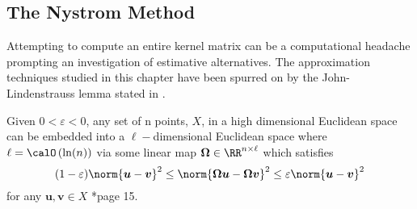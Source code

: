 \subsection{The Nystrom Method}\label{Section2.1}

Attempting to compute an entire kernel matrix can be a computational headache prompting an investigation of estimative alternatives. The approximation techniques studied in this chapter have been spurred on by the John-Lindenstrauss lemma stated in .

\begin{lem} \label{lem: John-Lindenstrauss}
    Given $0 < \varepsilon < 0$, any set of n points, $X$, in a high dimensional Euclidean space can be embedded into a $\ell-$dimensional Euclidean space where $\ell = \calO \left( \ln (n) \right)$ via some linear map $\bm{\Omega} \in \RR^{n \times \ell}$ which satisfies
    \[
        (1 - \varepsilon) \norm{\bm{u} - \bm{v}}^2 \leq \norm{\bm{\Omega} \bm{u} - \bm{\Omega} \bm{v}}^2 \leq \varepsilon \norm{\bm{u} - \bm{v}}^2
    \]
    for any $\bm{u}, \bm{v} \in X$ \cite{DBLP:journals/corr/abs-1104-5557}*{page 15}.
\end{lem}

